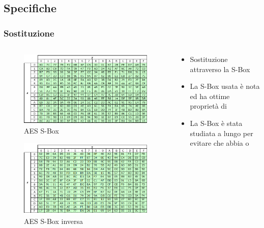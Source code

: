 	\subsection{Specifiche}
	
		\begin{frame}
			\frametitle{Sostituzione}
			\begin{columns}
				\begin{column}{0.45\textwidth}
					\begin{center}
						\begin{figure}
							\includegraphics[width=0.8\columnwidth]{img/aesbox}
							\caption{AES S-Box}
						\end{figure}
						\begin{figure}
							\includegraphics[width=0.8\columnwidth]{img/aesbox2}
							\caption{AES S-Box inversa}
						\end{figure}
					\end{center}
				\end{column}
				\begin{column}{0.7\textwidth}
					\begin{itemize}
						\item Sostituzione  attraverso la S-Box
						\item La S-Box usata è nota ed ha ottime proprietà di 
						\item La S-Box è stata studiata a lungo per evitare che abbia  o 
					\end{itemize}
				\end{column}
			\end{columns}
		\end{frame}
	
